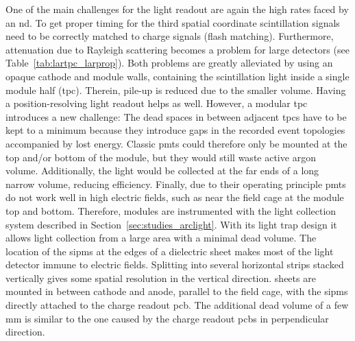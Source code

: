 One of the main challenges for the light readout are again the high rates faced by an \gls{nd}.
To get proper timing for the third spatial coordinate scintillation signals need to be correctly matched to charge signals (flash matching).
Furthermore, attenuation due to Rayleigh scattering becomes a problem for large detectors (see Table~\ref{tab:lartpc_larprop}).
Both problems are greatly alleviated by using an opaque cathode and module walls, containing the scintillation light inside a single module half (\gls{tpc}).
Therein, pile-up is reduced due to the smaller volume.
Having a position-resolving light readout helps as well.
However, a modular \gls{tpc} introduces a new challenge: The dead spaces in between adjacent \glspl{tpc} have to be kept to a minimum because they introduce gaps in the recorded event topologies accompanied by lost energy.
Classic \glspl{pmt} could therefore only be mounted at the top and/or bottom of the module, but they would still waste active argon volume.
Additionally, the light would be collected at the far ends of a long narrow volume, reducing efficiency.
Finally, due to their operating principle \glspl{pmt} do not work well in high electric fields, such as near the field cage at the module top and bottom.
Therefore, \AC{} modules are instrumented with the \AL{} light collection system described in Section~\ref{sec:studies_arclight}.
With its light trap design it  allows light collection from a large area with a minimal dead volume.
The location of the \glspl{sipm} at the edges of a dielectric sheet makes most of the light detector immune to electric fields.
Splitting \AL{} into several horizontal strips stacked vertically gives some spatial resolution in the vertical direction.
\AL{} sheets are mounted in between cathode and anode, parallel to the field cage, with the \glspl{sipm} directly attached to the charge readout \gls{pcb}.
The additional dead volume of a few \si{\milli\metre} is similar to the one caused by the charge readout \glspl{pcb} in perpendicular direction.